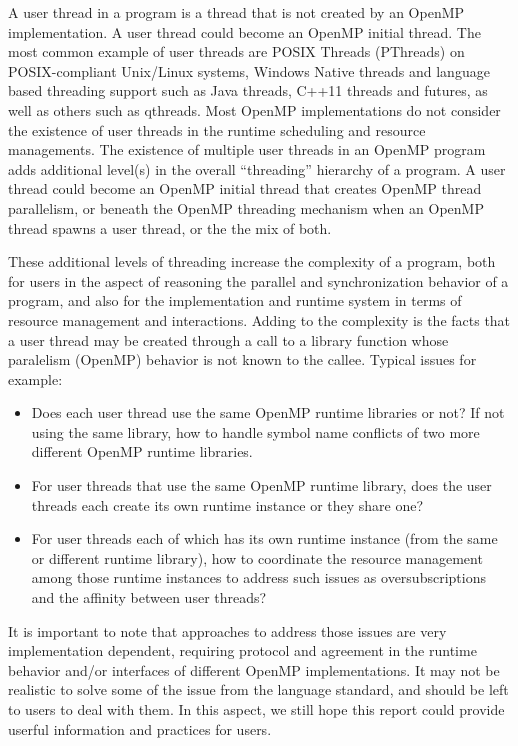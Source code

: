 A user thread in a program is a thread that is not created by an OpenMP implementation. A user thread 
could become an OpenMP initial thread. 
The most common example of user threads are POSIX Threads (PThreads) on POSIX-compliant Unix/Linux systems, 
Windows Native threads and language based threading support such as Java threads, C++11 threads and futures, as well as others such as qthreads. 
Most OpenMP implementations do not consider the existence of user threads in the runtime scheduling and resource managements. 
The existence of multiple user threads in an OpenMP program adds additional level(s) in the overall ``threading''
hierarchy of a program. %
A user thread could become an OpenMP initial thread that creates OpenMP thread
parallelism, or beneath the OpenMP threading mechanism when an OpenMP thread spawns 
a user thread, or the the mix of both. 

These additional levels of threading increase the complexity of a program, both for 
users in the aspect of reasoning the parallel and synchronization behavior of a program, 
and also for the implementation and runtime system in terms of resource management and 
interactions. Adding to the complexity is the facts that a user thread may be created 
through a call to a library function whose paralelism (OpenMP) behavior is not known to 
the callee. Typical issues for example: 
\begin{itemize}
\item Does each user thread use the same OpenMP runtime libraries or not? 
	If not using the same library, how to handle symbol name 
	conflicts of two more different OpenMP runtime libraries. 
\item For user threads that use the same OpenMP runtime library, does the user threads each create its own runtime instance or they share one?
\item For user threads each of which has its own runtime instance (from the same or 
	different runtime library), how to coordinate the resource management among those
	runtime instances to address such issues as oversubscriptions and the affinity
	between user threads?
\end{itemize}

It is important to note that approaches to address those issues are very implementation
dependent, requiring protocol and agreement in the runtime behavior and/or interfaces 
of different OpenMP implementations. It may not be realistic to solve some of the issue
from the language standard, and should be left to users to deal with them. In this
aspect, we still hope this report could provide userful information and practices 
for users. 

